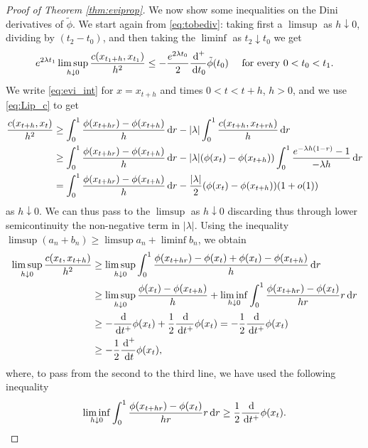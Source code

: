\documentclass[reqno]{amsart}
\theoremstyle{plain}
\theoremstyle{remark}
\theoremstyle{plain}
\numberwithin{equation}{section}
\theoremstyle{remark}
\newcommand{\de}{{\,\rm d}}
\begin{document}
\begin{proof}[Proof of Theorem \ref{thm:eviprop}]
We now  show some  inequalities on the Dini derivatives of $\tilde{\phi}$. We start again from \eqref{eq:tobediv}: taking first a $\limsup$ as $h \downarrow 0$, dividing by $(t_2-t_0)$, and  then taking the   $\liminf$ as $t_2 \downarrow t_0$ we get
\begin{equation}\label{eq:weakbound}
    e^{2\lambda t_1} \limsup_{h \downarrow 0} \frac{c(x_{t_1+h}, x_{t_1})}{h^2} \le - \frac{e^{2\lambda t_0}}{2} \frac{\de^+}{\de t_0} \tilde \phi (t_0) \quad \text{ for every } 0< t_0 < t_1.
\end{equation}
We write \eqref{eq:evi_int} for $x=x_{t+h}$ and times $0<t<t+h$, $h>0$, and we use \eqref{eq:Lip_c} to get
    \begin{align}
       \frac{c(x_{t+h},x_t)}{h^2} &\ge \int_0^1 \frac{\phi(x_{t+hr}) -\phi(x_{t+h})}{h} \de r - |\lambda | \int_0^1 \frac{c(x_{t+h},x_{t+rh})}{h} \de r \\
       & \ge \int_0^1 \frac{\phi(x_{t+hr}) -\phi(x_{t+h})}{h} \de r - |\lambda | (\phi(x_t)-\phi(x_{t+h})) \int_0^1 \frac{e^{-\lambda h(1-r)}-1}{-\lambda h} \de r \\ \label{eq:reveq}
       & = \int_0^1 \frac{\phi(x_{t+hr}) -\phi(x_{t+h})}{h} \de r -\frac{|\lambda |}{2} (\phi(x_t)-\phi(x_{t+h}))(1+o(1))
    \end{align} 
    as $h \downarrow 0$. We can thus pass to the $\limsup$ as $h \downarrow 0$ discarding thus through lower semicontinuity the non-negative term in $|\lambda |$. Using the inequality $\limsup (a_n+b_n) \ge \limsup a_n + \liminf b_n$, we obtain 
    \begin{align}\nonumber
       \limsup_{h \downarrow 0} \frac{ c(x_t,x_{t+h})}{h^2} &\ge \limsup_{h \downarrow 0}\int_0^1 \frac{\phi(x_{t+hr})-\phi(x_t)+\phi(x_t) -\phi(x_{t+h})}{h} \de r \\
       &\ge \limsup_{h \downarrow 0} \frac{\phi(x_t) -\phi(x_{t+h})}{h}+\liminf_{h \downarrow 0}\int_0^1 \frac{\phi(x_{t+hr})-\phi(x_t)}{hr} r\de r\nonumber\\
       &\ge -\frac{\de}{\de t^+}\phi(x_{t})+\frac{1}{2}\frac{\de}{\de t^+}\phi(x_{t})=-\frac{1}{2}\frac{\de}{\de t^+}\phi(x_{t})\nonumber \\
       &\ge -\frac{1}{2}\frac{\de^+}{\de t}\phi(x_{t}),\label{eq:energy_bound_local2} 
    \end{align}
    where, to pass from the second to the third line, we have used the following inequality
\begin{equation}\label{eq:pierre}
\liminf_{h \downarrow 0}\int_0^1 \frac{\phi(x_{t+hr})-\phi(x_t)}{hr} r\de r  \ge \frac{1}{2} \frac{\de}{\de t^+}\phi(x_{t}).

\end{equation}
\end{proof}
\end{document}
